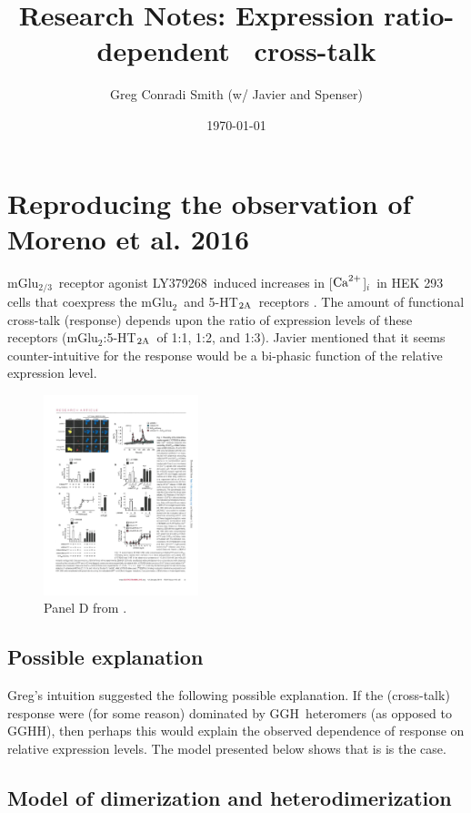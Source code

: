 \documentclass[12pt]{article}
\title{Research Notes: Expression ratio-dependent \MGluTwoFiveHTTwoA\ 
cross-talk}
\author{Greg Conradi Smith (w/ Javier and Spenser)}
\date{\today}
\def\MGluTwo{mGlu$_2$}
\def\MGluTwoThree{mGlu$_{2/3}$}
\def\FiveHTTwoA{5-HT$_{\rm 2A}$}
\def\ca{{\rm Ca}^{\rm 2+}}
\def\Ca{$\ca$}
\def\CaiConc{[\Ca]$_i$}
\def\LY{LY379268}
\def\GGH{{\rm GGH}}
\def\GGHH{{\rm GGHH}}
\begin{document}
\maketitle
\thispagestyle{empty}

\section*{\boldmath Reproducing the observation of Moreno et al. 2016}
 
  \MGluTwoThree\ receptor agonist \LY\ induced increases in \CaiConc\ in HEK 293 cells that coexpress the \MGluTwo\ and \FiveHTTwoA\ receptors \citep{MorenoEtal16}.  The amount of functional cross-talk (response) depends upon the ratio of expression levels of these receptors (\MGluTwo:\FiveHTTwoA\ of 1:1, 1:2, and 1:3).  Javier mentioned that it seems counter-intuitive for the response would be a  bi-phasic function of the relative expression level.  
 
  
\begin{figure}[h!]
    \centering
    \includegraphics[width=0.4\textwidth]{FigMorenoEtal2016Fig1d.pdf}
    \caption{Panel D from \cite{MorenoEtal16}. }
    \label{MorenoEtal}
\end{figure}

\subsection*{\boldmath Possible explanation}

Greg's intuition suggested the following possible explanation.  If the (cross-talk) response were (for some reason) dominated by \GGH\ heteromers (as opposed to \GGHH), then perhaps this would explain the observed dependence of response on relative expression levels.   The model presented below shows that is is the case.

\subsection*{\boldmath Model of dimerization and heterodimerization}
\end{document}

